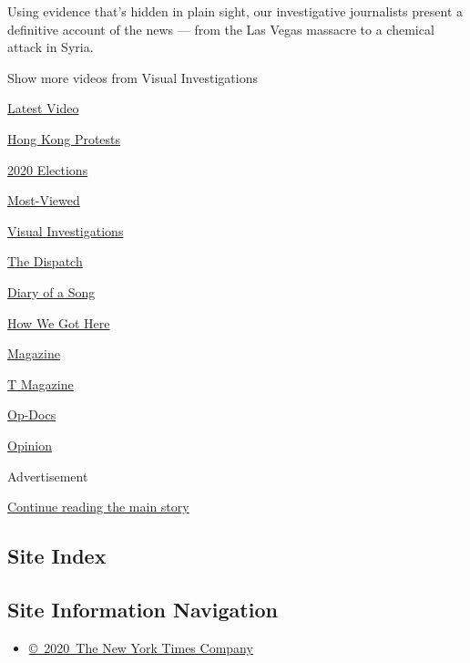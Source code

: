 Using evidence that's hidden in plain sight, our investigative
journalists present a definitive account of the news --- from the Las
Vegas massacre to a chemical attack in Syria.

Show more videos from Visual Investigations

\href{/video}{}

\href{/video/latest-video}{Latest Video}

\href{/video/hk-protest}{Hong Kong Protests}

\href{/video/2020-Elections}{2020 Elections}

\href{/video/Most-Viewed}{Most-Viewed}

\href{/video/investigations}{Visual Investigations}

\href{/video/on-the-ground}{The Dispatch}

\href{/video/diaryofasong}{Diary of a Song}

\href{/video/how-we-got-here}{How We Got Here}

\href{/video/magazine}{Magazine}

\href{/video/t-magazine}{T Magazine}

\href{/video/op-docs}{Op-Docs}

\href{/video/opinion}{Opinion}

Advertisement

\protect\hyperlink{after-bottom}{Continue reading the main story}

\hypertarget{site-index}{%
\subsection{Site Index}\label{site-index}}

\hypertarget{site-information-navigation}{%
\subsection{Site Information
Navigation}\label{site-information-navigation}}

\begin{itemize}
\tightlist
\item
  \href{https://help.nytimes.com/hc/en-us/articles/115014792127-Copyright-notice}{©~2020~The
  New York Times Company}
\end{itemize}

